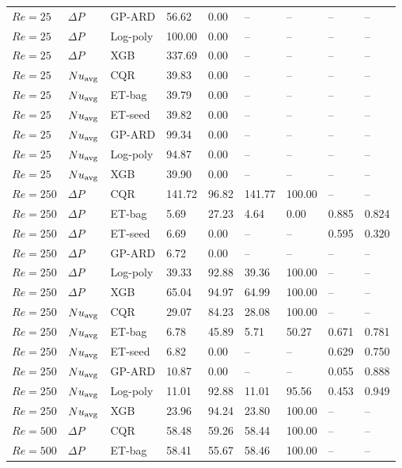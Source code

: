 \begin{longtable}{lllllllll}
$Re=25$ & $\Delta P$ & GP-ARD & 56.62 & 0.00 & -- & -- & -- & --\\
$Re=25$ & $\Delta P$ & Log-poly & 100.00 & 0.00 & -- & -- & -- & --\\
$Re=25$ & $\Delta P$ & XGB & 337.69 & 0.00 & -- & -- & -- & --\\
$Re=25$ & $Nu_{\rm avg}$ & CQR & 39.83 & 0.00 & -- & -- & -- & --\\
$Re=25$ & $Nu_{\rm avg}$ & ET-bag & 39.79 & 0.00 & -- & -- & -- & --\\
$Re=25$ & $Nu_{\rm avg}$ & ET-seed & 39.82 & 0.00 & -- & -- & -- & --\\
$Re=25$ & $Nu_{\rm avg}$ & GP-ARD & 99.34 & 0.00 & -- & -- & -- & --\\
$Re=25$ & $Nu_{\rm avg}$ & Log-poly & 94.87 & 0.00 & -- & -- & -- & --\\
$Re=25$ & $Nu_{\rm avg}$ & XGB & 39.90 & 0.00 & -- & -- & -- & --\\
$Re=250$ & $\Delta P$ & CQR & 141.72 & 96.82 & 141.77 & 100.00 & -- & --\\
$Re=250$ & $\Delta P$ & ET-bag & 5.69 & 27.23 & 4.64 & 0.00 & 0.885 & 0.824\\
$Re=250$ & $\Delta P$ & ET-seed & 6.69 & 0.00 & -- & -- & 0.595 & 0.320\\
$Re=250$ & $\Delta P$ & GP-ARD & 6.72 & 0.00 & -- & -- & -- & --\\
$Re=250$ & $\Delta P$ & Log-poly & 39.33 & 92.88 & 39.36 & 100.00 & -- & --\\
$Re=250$ & $\Delta P$ & XGB & 65.04 & 94.97 & 64.99 & 100.00 & -- & --\\
$Re=250$ & $Nu_{\rm avg}$ & CQR & 29.07 & 84.23 & 28.08 & 100.00 & -- & --\\
$Re=250$ & $Nu_{\rm avg}$ & ET-bag & 6.78 & 45.89 & 5.71 & 50.27 & 0.671 & 0.781\\
$Re=250$ & $Nu_{\rm avg}$ & ET-seed & 6.82 & 0.00 & -- & -- & 0.629 & 0.750\\
$Re=250$ & $Nu_{\rm avg}$ & GP-ARD & 10.87 & 0.00 & -- & -- & 0.055 & 0.888\\
$Re=250$ & $Nu_{\rm avg}$ & Log-poly & 11.01 & 92.88 & 11.01 & 95.56 & 0.453 & 0.949\\
$Re=250$ & $Nu_{\rm avg}$ & XGB & 23.96 & 94.24 & 23.80 & 100.00 & -- & --\\
$Re=500$ & $\Delta P$ & CQR & 58.48 & 59.26 & 58.44 & 100.00 & -- & --\\
$Re=500$ & $\Delta P$ & ET-bag & 58.41 & 55.67 & 58.46 & 100.00 & -- & --\\

\end{longtable}
